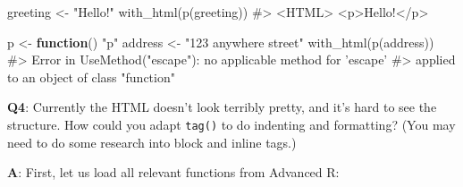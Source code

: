 \documentclass[
]{krantz}
\makeatletter
\newenvironment{Shaded}{\begin{snugshade}}{\end{snugshade}}
\newcommand{\CommentTok}[1]{\textcolor[rgb]{0.56,0.35,0.01}{\textit{#1}}}
\newcommand{\ControlFlowTok}[1]{\textcolor[rgb]{0.13,0.29,0.53}{\textbf{#1}}}
\newcommand{\KeywordTok}[1]{\textcolor[rgb]{0.13,0.29,0.53}{\textbf{#1}}}
\newcommand{\NormalTok}[1]{#1}
\newcommand{\StringTok}[1]{\textcolor[rgb]{0.31,0.60,0.02}{#1}}
\newenvironment{kframe}{%
\medskip{}
\setlength{\fboxsep}{.8em}
 \def\at@end@of@kframe{}%
 \ifinner\ifhmode%
  \def\at@end@of@kframe{\end{minipage}}%
  \begin{minipage}{\columnwidth}%
 \fi\fi%
 \def\FrameCommand##1{\hskip\@totalleftmargin \hskip-\fboxsep
 \colorbox{shadecolor}{##1}\hskip-\fboxsep
     \hskip-\linewidth \hskip-\@totalleftmargin \hskip\columnwidth}%
 \MakeFramed {\advance\hsize-\width
   \@totalleftmargin\z@ \linewidth\hsize
   \@setminipage}}%
 {\par\unskip\endMakeFramed%
 \at@end@of@kframe}
\renewenvironment{Shaded}{\begin{kframe}}{\end{kframe}}
\renewcommand{\KeywordTok} [1]{\textcolor[rgb]{0.00,0.44,0.13}{{#1}}}
\renewcommand{\StringTok}  [1]{\textcolor[rgb]{0.25,0.44,0.63}{{#1}}}
\renewcommand{\CommentTok} [1]{\textcolor[rgb]{0.38,0.63,0.69}{{#1}}}
\renewcommand{\NormalTok}  [1]{{#1}}
\makeatother
\begin{document}
\begin{Shaded}
\begin{Highlighting}[]
\NormalTok{greeting <-}\StringTok{ "Hello!"}
\KeywordTok{with_html}\NormalTok{(}\KeywordTok{p}\NormalTok{(greeting))}
\CommentTok{#> <HTML> <p>Hello!</p>}

\NormalTok{p <-}\StringTok{ }\ControlFlowTok{function}\NormalTok{() }\StringTok{"p"}
\NormalTok{address <-}\StringTok{ "123 anywhere street"}
\KeywordTok{with_html}\NormalTok{(}\KeywordTok{p}\NormalTok{(address))}
\CommentTok{#> Error in UseMethod("escape"): no applicable method for 'escape'}
\CommentTok{#> applied to an object of class "function"}
\end{Highlighting}
\end{Shaded}

\textbf{{Q4}}: Currently the HTML doesn't look terribly pretty, and it's hard to see the structure. How could you adapt \texttt{tag()} to do indenting and formatting? (You may need to do some research into block and inline tags.)

\textbf{{A}}: First, let us load all relevant functions from Advanced R:
\end{document}
